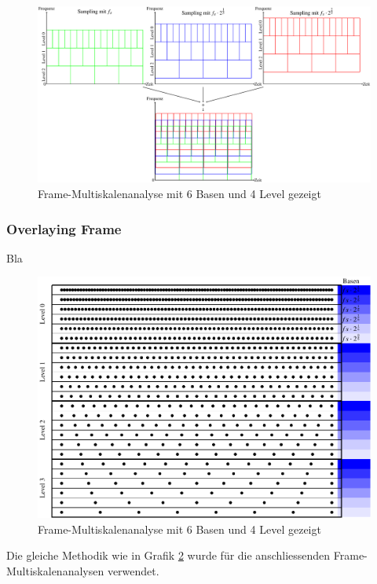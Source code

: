 \begin{figure}[h]
	\centering
	\includegraphics[width=\linewidth]{papers/autotune/sections/frames/images/frame/msa.pdf}
	\caption{Frame-Multiskalenanalyse mit 6 Basen und 4 Level gezeigt}\label{fig:frame_konst}
\end{figure}%

\subsubsection{Overlaying Frame}
Bla
\begin{figure}[h]
	\centering
	\includegraphics[width=\linewidth]{papers/autotune/sections/frames/images/msa/msa.pdf}
	\caption{Frame-Multiskalenanalyse mit 6 Basen und 4 Level gezeigt}\label{fig:frame_konst}
\end{figure}%


Die gleiche Methodik wie in Grafik \ref{fig:frame_konst} wurde für die anschliessenden Frame-Multiskalenanalysen verwendet.


